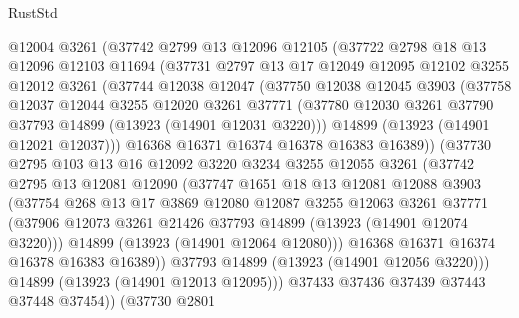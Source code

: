 \begin{lexlean}{RustStd}
\begin{coremodule}
        @12004
        @3261
        (@37742
          @2799
          @13
          @12096
          @12105
          (@37722
            @2798
            @18
            @13
            @12096
            @12103
            @11694
            (@37731
              @2797
              @13
              @17
              @12049
              @12095
              @12102
              @3255
              @12012
              @3261
              (@37744
                @12038
                @12047
                (@37750
                  @12038
                  @12045
                  @3903
                  (@37758
                    @12037
                    @12044
                    @3255
                    @12020
                    @3261
                    @37771
                    (@37780 @12030 @3261 @37790 @37793 @14899 (@13923 (@14901 @12031 @3220)))
                    @14899
                    (@13923 (@14901 @12021 @12037)))
                  @16368
                  @16371
                  @16374
                  @16378
                  @16383
                  @16389))
              (@37730
                @2795
                @103
                @13
                @16
                @12092
                @3220
                @3234
                @3255
                @12055
                @3261
                (@37742
                  @2795
                  @13
                  @12081
                  @12090
                  (@37747
                    @1651
                    @18
                    @13
                    @12081
                    @12088
                    @3903
                    (@37754
                      @268
                      @13
                      @17
                      @3869
                      @12080
                      @12087
                      @3255
                      @12063
                      @3261
                      @37771
                      (@37906 @12073 @3261 @21426 @37793 @14899 (@13923 (@14901 @12074 @3220)))
                      @14899
                      (@13923 (@14901 @12064 @12080)))
                    @16368
                    @16371
                    @16374
                    @16378
                    @16383
                    @16389))
                @37793
                @14899
                (@13923 (@14901 @12056 @3220)))
              @14899
              (@13923 (@14901 @12013 @12095)))
            @37433
            @37436
            @37439
            @37443
            @37448
            @37454))
        (@37730
          @2801

\end{coremodule}
\end{lexlean}
